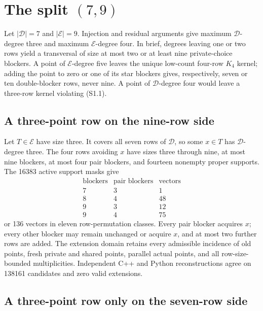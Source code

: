 \documentclass[11pt,a4paper]{article}
\theoremstyle{definition}
\begin{document}
\section{The split \texorpdfstring{$(7,9)$}{(7,9)}}
\label{sec:seven-nine}

Let $|\mathcal D|=7$ and $|\mathcal E|=9$.  Injection and residual
arguments give maximum $\mathcal D$-degree three and maximum
$\mathcal E$-degree four.  In brief, degrees leaving one or two rows yield
a transversal of size at most two or at least nine private-choice blockers.
A point of $\mathcal E$-degree five leaves the unique low-count four-row
$K_4$ kernel; adding the point to zero or one of its star blockers gives,
respectively, seven or ten double-blocker rows, never nine.  A point of
$\mathcal D$-degree four would leave a three-row kernel violating (S1.1).

\subsection{A three-point row on the nine-row side}

Let $T\in\mathcal E$ have size three.  It covers all seven rows of
$\mathcal D$, so some $x\in T$ has $\mathcal D$-degree three.  The four rows
avoiding $x$ have sizes three through nine, at most nine blockers, at most
four pair blockers, and fourteen nonempty proper supports.  The 16383 active
support masks give
\[
\begin{array}{c|c|r}
\text{blockers}&\text{pair blockers}&\text{vectors}\\
\hline
7&3&1\\
8&4&48\\
9&3&12\\
9&4&75
\end{array}                                                   \tag{S9.1}
\]
or 136 vectors in eleven row-permutation classes.  Every pair blocker
acquires $x$; every other blocker may remain unchanged or acquire $x$, and
at most two further rows are added.  The extension domain retains every
admissible incidence of old points, fresh private and shared points, parallel
actual points, and all row-size-bounded multiplicities.  Independent C++ and
Python reconstructions agree on 138161 candidates and zero valid extensions.

\subsection{A three-point row only on the seven-row side}
\end{document}
